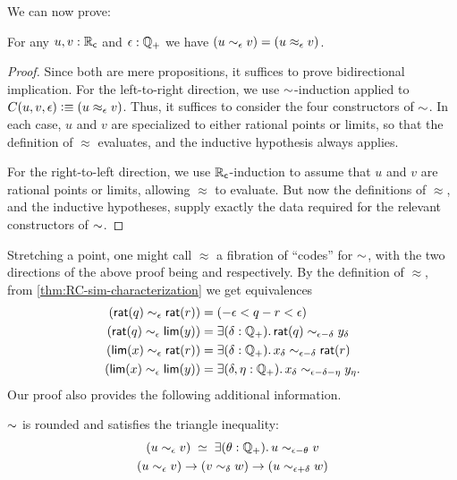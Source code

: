 We can now prove:

\begin{thm}\label{thm:RC-sim-characterization}
  For any $u,v:\mathbb{R}_\mathsf{c}$ and $\epsilon:\mathbb{Q}_{+}$ we have $(u\sim_{\epsilon} v) = (u\approx_\epsilon v)$.
\end{thm}
\begin{proof}
  Since both are mere propositions, it suffices to prove bidirectional implication.
  For the left-to-right direction, we use $\mathord\sim$-induction applied to $C(u,v,\epsilon)\vcentcolon\equiv (u\approx_\epsilon v)$.
  Thus, it suffices to consider the four constructors of $\mathord\sim$.
  In each case, $u$ and $v$ are specialized to either rational points or limits, so that the definition of $\approx$ evaluates, and the inductive hypothesis always applies.

  For the right-to-left direction, we use $\mathbb{R}_\mathsf{c}$-induction to assume that $u$ and $v$ are rational points or limits, allowing $\approx$ to evaluate.
  But now the definitions of $\approx$, and the inductive hypotheses, supply exactly the data required for the relevant constructors of $\mathord\sim$.
\end{proof}

Stretching a point, one might call $\approx$ a fibration of ``codes'' for $\mathord\sim$, with the two directions of the above proof being \encode and \decode respectively.
By the definition of $\approx$, from \autoref{thm:RC-sim-characterization} we get equivalences
\begin{align*}
  (\rcrat(q) \close\epsilon \rcrat(r))  &=
  (-\epsilon < q - r < \epsilon)\\
  (\rcrat(q) \close\epsilon \rclim(y)) &=
  \exis{\delta : \Qp} \rcrat(q) \close{\epsilon - \delta} y_\delta\\
  (\rclim(x) \close\epsilon \rcrat(r)) &=
  \exis{\delta : \Qp} x_\delta \close{\epsilon - \delta} \rcrat(r)\\
  (\rclim(x) \close\epsilon \rclim(y)) &=
  \exis{\delta, \eta : \Qp} x_\delta \close{\epsilon - \delta - \eta} y_\eta.
\end{align*}
Our proof also provides the following additional information.

\begin{cor}
  $\mathord\sim$ is rounded and satisfies the triangle inequality:
    \begin{gather}
      \eqvspaced{
        (u \close\epsilon v)
      }{
        \exis{\theta : \Qp} u \close{\epsilon - \theta} v
      }\\
      (u\close\epsilon v) \to (v\close\delta w) \to (u\close{\epsilon+\delta} w)\label{item:RC-sim-triangle}
    \end{gather}
\end{cor}

